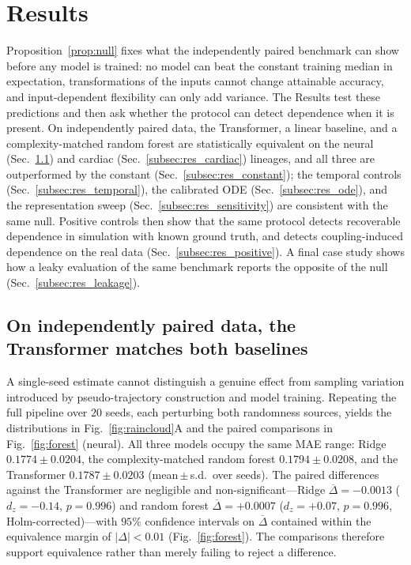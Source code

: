 \documentclass[pdflatex,sn-mathphys-num]{sn-jnl}
\theoremstyle{thmstyleone}%
\theoremstyle{thmstyletwo}%
\theoremstyle{thmstylethree}%
\begin{document}
\section{\textbf{Results}}
\label{sec:results}

Proposition~\ref{prop:null} fixes what the independently paired benchmark can show before any model is trained: no model can beat the constant training median in expectation, transformations of the inputs cannot change attainable accuracy, and input-dependent flexibility can only add variance. The Results test these predictions and then ask whether the protocol can detect dependence when it is present. On independently paired data, the Transformer, a linear baseline, and a complexity-matched random forest are statistically equivalent on the neural (Sec.~\ref{subsec:res_neural}) and cardiac (Sec.~\ref{subsec:res_cardiac}) lineages, and all three are outperformed by the constant (Sec.~\ref{subsec:res_constant}); the temporal controls (Sec.~\ref{subsec:res_temporal}), the calibrated ODE (Sec.~\ref{subsec:res_ode}), and the representation sweep (Sec.~\ref{subsec:res_sensitivity}) are consistent with the same null. Positive controls then show that the same protocol detects recoverable dependence in simulation with known ground truth, and detects coupling-induced dependence on the real data (Sec.~\ref{subsec:res_positive}). A final case study shows how a leaky evaluation of the same benchmark reports the opposite of the null (Sec.~\ref{subsec:res_leakage}).

\subsection{\textbf{On independently paired data, the Transformer matches both baselines}}
\label{subsec:res_neural}

A single-seed estimate cannot distinguish a genuine effect from sampling variation introduced by pseudo-trajectory construction and model training. Repeating the full pipeline over $20$ seeds, each perturbing both randomness sources, yields the distributions in Fig.~\ref{fig:raincloud}A and the paired comparisons in Fig.~\ref{fig:forest} (neural). All three models occupy the same MAE range: Ridge $0.1774\pm0.0204$, the complexity-matched random forest $0.1794\pm0.0208$, and the Transformer $0.1787\pm0.0203$ (mean\,$\pm$\,s.d.\ over seeds). The paired differences against the Transformer are negligible and non-significant---Ridge $\overline{\Delta}=-0.0013$ ($d_z=-0.14$, $p=0.996$) and random forest $\overline{\Delta}=+0.0007$ ($d_z=+0.07$, $p=0.996$, Holm-corrected)---with $95\%$ confidence intervals on $\overline{\Delta}$ contained within the equivalence margin of $|\Delta|<0.01$ (Fig.~\ref{fig:forest}). The comparisons therefore support equivalence rather than merely failing to reject a difference.
\end{document}

